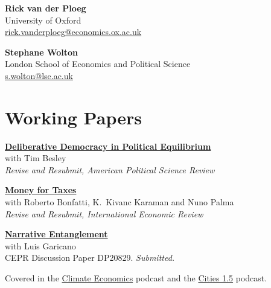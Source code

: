 \documentclass[10pt,a4paper]{article}
\newcommand{\papernote}[1]{\hspace*{1.6em}#1\par}
\newcommand{\papergap}{\par\addvspace{8pt}}
\newenvironment{paperbox}{\par\noindent\begin{minipage}{\textwidth}}{\end{minipage}\par}
\begin{document}
\vspace{10pt}
\noindent
\begin{minipage}[t]{0.5\textwidth}
\textbf{Rick van der Ploeg}\\
University of Oxford\\
\href{mailto:rick.vanderploeg@economics.ox.ac.uk}{rick.vanderploeg@economics.ox.ac.uk}
\end{minipage}%
\begin{minipage}[t]{0.5\textwidth}
\textbf{Stephane Wolton}\\
London School of Economics and Political Science\\
\href{mailto:s.wolton@lse.ac.uk}{s.wolton@lse.ac.uk}
\end{minipage}

\section{Working Papers}

\begin{paperbox}
\textbf{\href{https://drive.google.com/file/d/1Q8lMeOlQE5Nf6-8bWvSlTWWCtPO0otZp/view}{Deliberative Democracy in Political Equilibrium}}\\
with Tim Besley\\
\textit{Revise and Resubmit, American Political Science Review}
\end{paperbox}
\papergap

\begin{paperbox}
\textbf{\href{https://cepr.org/active/publications/discussion_papers/dp.php?dpno=15299}{Money for Taxes}}\\
with Roberto Bonfatti, K.\ Kivanc Karaman and Nuno Palma\\
\textit{Revise and Resubmit, International Economic Review}
\end{paperbox}
\papergap

\begin{paperbox}
\textbf{\href{https://cepr.org/publications/dp20829}{Narrative Entanglement}}\\
with Luis Garicano\\
CEPR Discussion Paper DP20829. \textit{Submitted.}\par
\papernote{Covered in the \href{https://www.climateeconomicswitharvid.com/p/30-dr-adam-brzezinski-how-narratives}{Climate Economics} podcast and the \href{https://cities1point5.buzzsprout.com/2054827/episodes/19604294-hot-take-urban-legends-sorting-city-climate-facts-from-fiction}{Cities 1.5} podcast.}
\end{paperbox}
\papergap
\end{document}
